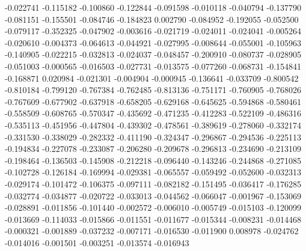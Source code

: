 -0.022741
-0.115182
-0.100860
-0.122844
-0.091598
-0.010118
-0.040794
-0.137790
-0.081151
-0.155501
-0.084746
-0.184823
0.002790
-0.084952
-0.192055
-0.052500
-0.079117
-0.352325
-0.047902
-0.003616
-0.021719
-0.024011
-0.024041
-0.005264
-0.020610
-0.004373
-0.064613
-0.044921
-0.027995
-0.008644
-0.055001
-0.105963
-0.140905
-0.022215
-0.032813
-0.024037
-0.048457
-0.200910
-0.080737
-0.028905
-0.051003
-0.000565
-0.016503
-0.027731
-0.013575
-0.077260
-0.068731
-0.154841
-0.168871
0.020984
-0.021301
-0.004904
-0.000945
-0.136641
-0.033709
-0.800542
-0.810184
-0.799120
-0.767384
-0.762485
-0.813136
-0.751171
-0.760905
-0.768026
-0.767609
-0.677902
-0.637918
-0.658205
-0.629168
-0.645625
-0.594868
-0.580461
-0.558509
-0.608765
-0.570347
-0.435692
-0.471235
-0.412283
-0.522109
-0.486316
-0.535113
-0.451956
-0.447804
-0.439302
-0.478561
-0.389619
-0.278060
-0.332174
-0.331530
-0.338029
-0.282332
-0.411190
-0.324347
-0.296867
-0.294536
-0.225113
-0.194834
-0.227078
-0.233087
-0.206280
-0.209678
-0.296813
-0.234690
-0.213109
-0.198464
-0.136503
-0.145908
-0.212218
-0.096440
-0.143246
-0.244868
-0.271085
-0.102728
-0.126184
-0.169994
-0.029381
-0.065557
-0.059492
-0.052600
-0.032313
-0.029174
-0.101472
-0.106375
-0.097111
-0.082182
-0.151495
-0.036417
-0.176285
-0.032774
-0.034877
-0.020722
-0.033013
-0.044562
-0.066047
-0.001967
-0.153069
-0.028891
-0.011856
-0.101440
-0.002572
-0.006010
-0.005749
-0.015103
-0.120099
-0.013669
-0.114033
-0.015866
-0.011551
-0.011677
-0.015344
-0.008231
-0.014468
-0.000321
-0.001889
-0.037232
-0.007171
-0.016530
-0.011900
0.008978
-0.024762
-0.014016
-0.001501
-0.003251
-0.013574
-0.016943

